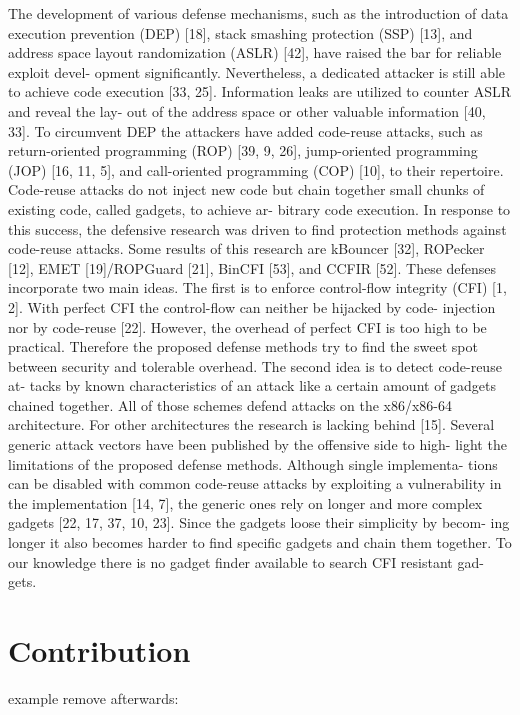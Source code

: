 The development of various defense mechanisms, such as the introduction of data
execution prevention (DEP) [18], stack smashing protection (SSP) [13], and address
space layout randomization (ASLR) [42], have raised the bar for reliable exploit devel-
opment significantly. Nevertheless, a dedicated attacker is still able to achieve code
execution [33, 25]. Information leaks are utilized to counter ASLR and reveal the lay-
out of the address space or other valuable information [40, 33]. To circumvent DEP
the attackers have added code-reuse attacks, such as return-oriented programming
(ROP) [39, 9, 26], jump-oriented programming (JOP) [16, 11, 5], and call-oriented
programming (COP) [10], to their repertoire. Code-reuse attacks do not inject new
code but chain together small chunks of existing code, called gadgets, to achieve ar-
bitrary code execution.
In response to this success, the defensive research was driven to find protection
methods against code-reuse attacks. Some results of this research are kBouncer [32],
ROPecker [12], EMET [19]/ROPGuard [21], BinCFI [53], and CCFIR [52]. These
defenses incorporate two main ideas. The first is to enforce control-flow integrity
(CFI) [1, 2]. With perfect CFI the control-flow can neither be hijacked by code-
injection nor by code-reuse [22]. However, the overhead of perfect CFI is too high
to be practical. Therefore the proposed defense methods try to find the sweet spot
between security and tolerable overhead. The second idea is to detect code-reuse at-
tacks by known characteristics of an attack like a certain amount of gadgets chained
together. All of those schemes defend attacks on the x86/x86-64 architecture. For
other architectures the research is lacking behind [15].
Several generic attack vectors have been published by the offensive side to high-
light the limitations of the proposed defense methods. Although single implementa-
tions can be disabled with common code-reuse attacks by exploiting a vulnerability
in the implementation [14, 7], the generic ones rely on longer and more complex
gadgets [22, 17, 37, 10, 23]. Since the gadgets loose their simplicity by becom-
ing longer it also becomes harder to find specific gadgets and chain them together.
To our knowledge there is no gadget finder available to search CFI resistant gad-
gets.

\section{Contribution}
\label{Contribution}
example remove afterwards:

